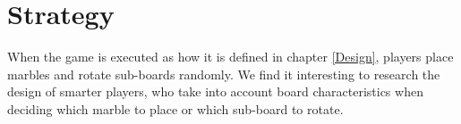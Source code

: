 \section{Strategy}
\label{Strategy}
When the game is executed as how it is defined in chapter \ref{Design}, players place marbles and rotate sub-boards randomly.
We find it interesting to research the design of smarter players, who take into account board characteristics when deciding which marble to place or which sub-board to rotate.
